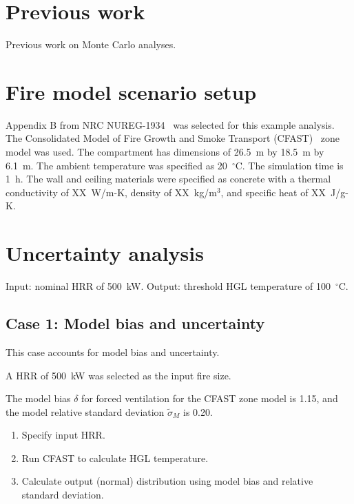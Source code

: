 \documentclass[12pt]{article}
\begin{document}
\section{Previous work}
\label{sec:previous_work}

Previous work on Monte Carlo analyses.


\section{Fire model scenario setup}
\label{sec:fire_model_scenario_setup}

Appendix B from NRC NUREG-1934~\cite{NUREG_1934} was selected for this example analysis. The Consolidated Model of Fire Growth and Smoke Transport (CFAST)~\cite{CFAST_Users_Guide_6} zone model was used. The compartment has dimensions of 26.5~m by 18.5~m by 6.1~m. The ambient temperature was specified as 20~$^\circ$C. The simulation time is 1~h. The wall and ceiling materials were specified as concrete with a thermal conductivity of XX~W/m-K, density of XX~kg/m$^3$, and specific heat of XX~J/g-K.


\section{Uncertainty analysis}
\label{sec:uncertainty_analysis}

Input: nominal HRR of 500~kW.
Output: threshold HGL temperature of 100~$^\circ$C.


\clearpage


\subsection{Case 1: Model bias and uncertainty}

This case accounts for model bias and uncertainty.

A HRR of 500~kW was selected as the input fire size.

The model bias $\delta$ for forced ventilation for the CFAST zone model is 1.15, and the model relative standard deviation $\widetilde\sigma_M$ is 0.20.

\begin{enumerate}
\item Specify input HRR.
\item Run CFAST to calculate HGL temperature.
\item Calculate output (normal) distribution using model bias and relative standard deviation.
\end{enumerate}
\end{document}
